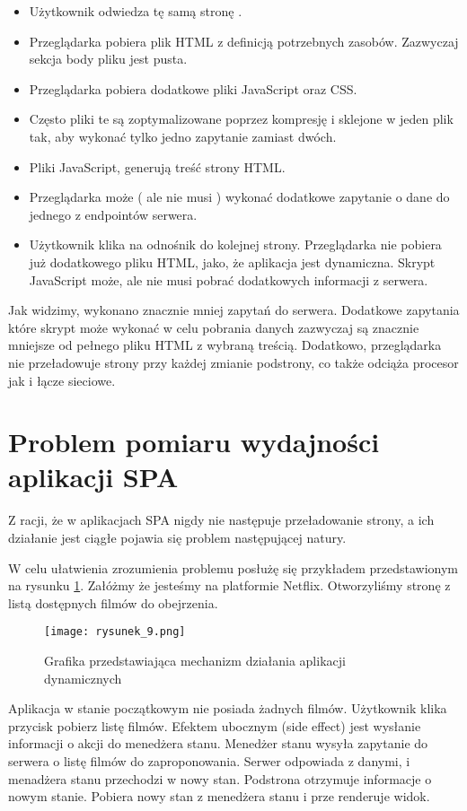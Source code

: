 \begin{itemize}
    \item Użytkownik odwiedza tę samą stronę .
    \item Przeglądarka pobiera plik HTML z definicją potrzebnych zasobów. Zazwyczaj sekcja body pliku jest pusta.
    \item Przeglądarka pobiera dodatkowe pliki JavaScript oraz CSS.
    \item Często pliki te są zoptymalizowane poprzez kompresję i sklejone w jeden plik tak, aby wykonać tylko jedno zapytanie zamiast dwóch.
    \item Pliki JavaScript, generują treść strony HTML.
    \item Przeglądarka może ( ale nie musi ) wykonać dodatkowe zapytanie o dane do jednego z endpointów serwera.
    \item Użytkownik klika na odnośnik do kolejnej strony. Przeglądarka nie pobiera już dodatkowego pliku HTML, jako, że aplikacja jest dynamiczna. Skrypt JavaScript może, ale nie musi pobrać dodatkowych informacji z serwera.    
\end{itemize}

Jak widzimy, wykonano znacznie mniej zapytań do serwera. Dodatkowe zapytania które skrypt może wykonać w celu pobrania danych zazwyczaj są znacznie mniejsze od pełnego pliku HTML z wybraną treścią.
Dodatkowo, przeglądarka nie przeładowuje strony przy każdej zmianie podstrony, co także odciąża procesor jak i łącze sieciowe.

\section{Problem pomiaru wydajności aplikacji SPA}

Z racji, że w aplikacjach SPA nigdy nie następuje przeładowanie strony, a ich działanie jest ciągłe pojawia się problem następującej natury. 

W celu ułatwienia zrozumienia problemu posłużę się przykładem przedstawionym na rysunku \ref{fig:rysunek_9}. Załóżmy że jesteśmy na platformie Netflix. Otworzyliśmy stronę z listą dostępnych filmów do obejrzenia. 

\begin{figure}[!ht]
    \centering
    \texttt{[image: rysunek\_9.png]}
    \caption{Grafika przedstawiająca mechanizm działania aplikacji dynamicznych}
    \label{fig:rysunek_9}
\end{figure}

Aplikacja w stanie początkowym nie posiada żadnych filmów. Użytkownik klika przycisk pobierz listę filmów. Efektem ubocznym (side effect)  jest wysłanie informacji o akcji do menedżera stanu.
Menedżer stanu wysyła zapytanie do serwera o listę filmów do zaproponowania. Serwer odpowiada z danymi, i menadżera stanu przechodzi w nowy stan.
Podstrona otrzymuje informacje o nowym stanie. Pobiera nowy stan z menedżera stanu i prze renderuje widok.

